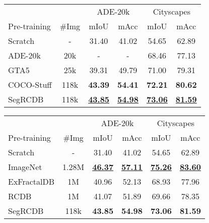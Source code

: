 \documentclass[10pt,twocolumn,letterpaper]{article}
\begin{document}
\begin{table*}[t]
\begin{minipage}[t]{.5\hsize}
  \centering
  \caption{Comparison of pre-training with semantic segmentation datasets. The best and second-best values for each fine-tuning dataset are in underlined bold and bold, respectively.}
  \begin{tabular}{lccccc}
    \toprule
        &  &\multicolumn{2}{c}{ADE-20k} & \multicolumn{2}{c}{Cityscapes} \\
        Pre-training & \#Img &  mIoU & mAcc & mIoU & mAcc \\
    \midrule
        Scratch&-&31.40 &41.02 &54.65&62.89 \\
        ADE-20k& 20k & - &-&68.46 &77.13\\
        GTA5& 25k &39.31&49.79& 71.00&79.31 \\
        COCO-Stuff& 118k &\textbf{43.39} &\textbf{54.41} &\textbf{72.21}&\textbf{80.62} \\
        SegRCDB&118k & \underline{\textbf{43.85}}&\underline{\textbf{54.98}} & \underline{\textbf{73.06}} &\underline{\textbf{81.59}} \\
    \bottomrule
    \end{tabular}
  \label{segment_comparison}
  \vspace{-5pt}
\end{minipage}
\begin{minipage}[t]{.48\hsize}
 \centering
 \caption{Comparison with backbone pre-training. The best and second-best values for each fine-tuning dataset are in underlined bold and bold, respectively.} 
    \begin{tabular}{lccccc}
      \toprule
        &  &\multicolumn{2}{c}{ADE-20k} & \multicolumn{2}{c}{Cityscapes} \\
        Pre-training & \#Img &  mIoU & mAcc & mIoU & mAcc \\
        \bottomrule[0.5pt]
        Scratch & -& 31.40 & 41.02 & 54.65 & 62.89 \\
        ImageNet& 1.28M & \underline{\textbf{46.37}} & \underline{\textbf{57.11}} & \underline{\textbf{75.26}}& \underline{\textbf{83.60}} \\
        ExFractalDB&1M&  40.96 & 52.13  & 68.93 & 77.96\\
        RCDB&1M &  41.07 & 51.89 &  69.66 & 78.35  \\
        SegRCDB&118k & \textbf{43.85} & \textbf{54.98} & \textbf{73.06} & \textbf{81.59}    \\
        \bottomrule
 \end{tabular}
\label{backbone_compare}
\end{minipage}
\end{table*}
\end{document}
